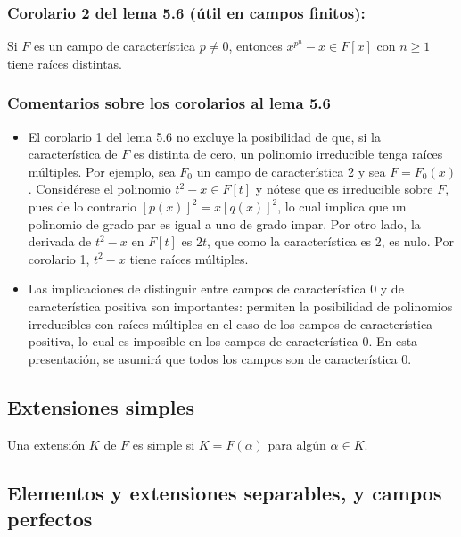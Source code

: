 \documentclass{article}
\begin{document}
\subsubsection*{\color{blue} Corolario 2 del lema 5.6 (útil en campos finitos):}

Si $F$ es un campo de característica $p\neq 0$, entonces $x^{p^n}-x\in F[x]$ con $n\geq 1$ tiene raíces distintas.

\subsubsection*{\color{teal} Comentarios sobre los corolarios al lema 5.6}

\begin{itemize}
\item El corolario 1 del lema 5.6 no excluye la posibilidad de que, si la característica de $F$ es distinta de cero, un polinomio irreducible tenga raíces múltiples. Por ejemplo, sea $F_0$ un campo de característica 2 y sea $F=F_0(x)$. Considérese el polinomio $t^2-x\in F[t]$ y nótese que es irreducible sobre $F$, pues de lo contrario $[p(x)]^2=x[q(x)]^2$, lo cual implica que un polinomio de grado par es igual a uno de grado impar. Por otro lado, la derivada de $t^2-x$ en $F[t]$ es $2t$, que como la característica es 2, es nulo. Por corolario 1, $t^2-x$ tiene raíces múltiples.

\item Las implicaciones de distinguir entre campos de característica 0 y de característica positiva son importantes: permiten la posibilidad de polinomios irreducibles con raíces múltiples en el caso de los campos de característica positiva, lo cual es imposible en los campos de característica 0. En esta presentación, se asumirá que todos los campos son de característica 0.
\end{itemize}

\subsection*{\color{violet} Extensiones simples}

Una extensión $K$ de $F$ es simple si $K=F(\alpha)$ para algún $\alpha\in K$.

\subsection*{\color{violet} Elementos y extensiones separables, y campos perfectos}
\end{document}

